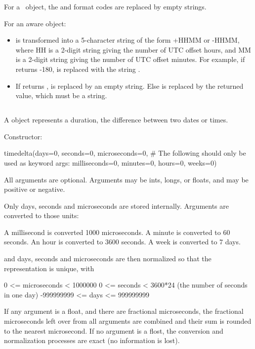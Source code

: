 For a \naive\ object, the  and  format codes are
replaced by empty strings.

For an aware object:

\begin{itemize}
  \item[\code{\%z}]
     is transformed into a 5-character string of
    the form +HHMM or -HHMM, where HH is a 2-digit string giving the
    number of UTC offset hours, and MM is a 2-digit string giving the
    number of UTC offset minutes.  For example, if
     returns -180,  is replaced with the
    string .

  \item[\code{\%Z}]
    If  returns ,  is replaced
    by an empty string.  Else  is replaced by the returned
    value, which must be a string.
\end{itemize}


\subsection{ \label{datetime-timedelta}}

A  object represents a duration, the difference
between two dates or times.

Constructor:

    timedelta(days=0, seconds=0, microseconds=0,
              \# The following should only be used as keyword args:
              milliseconds=0, minutes=0, hours=0, weeks=0)

    All arguments are optional.  Arguments may be ints, longs, or floats,
    and may be positive or negative.

    Only days, seconds and microseconds are stored internally.  Arguments
    are converted to those units:

        A millisecond is converted 1000 microseconds.
        A minute is converted to 60 seconds.
        An hour is converted to 3600 seconds.
        A week is converted to 7 days.

    and days, seconds and microseconds are then normalized so that the
    representation is unique, with

        0 <= microseconds < 1000000
        0 <= seconds < 3600*24 (the number of seconds in one day)
        -999999999 <= days <= 999999999

    If any argument is a float, and there are fractional microseconds,
    the fractional microseconds left over from all arguments are combined
    and their sum is rounded to the nearest microsecond.  If no
    argument is a flost, the conversion and normalization processes
    are exact (no information is lost).

